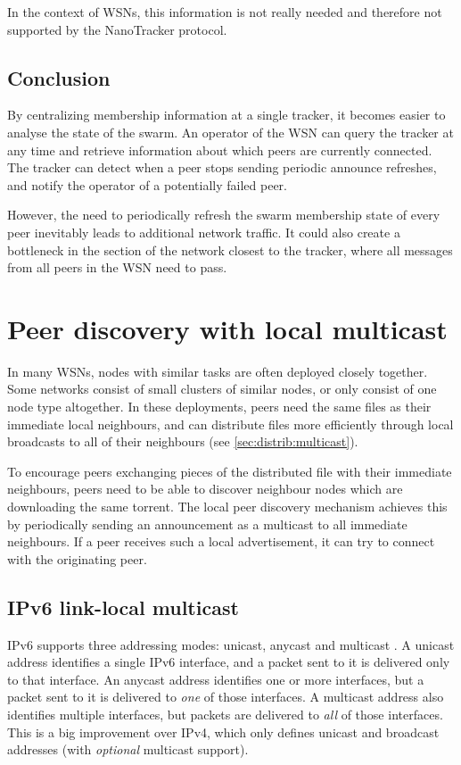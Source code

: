 In the context of \glspl{WSN}, this information is not really needed and therefore not supported by the NanoTracker protocol.

\subsection{Conclusion}
By centralizing membership information at a single tracker, it becomes easier to analyse the state of the swarm. An operator of the \gls{WSN} can query the tracker at any time and retrieve information about which peers are currently connected. The tracker can detect when a peer stops sending periodic announce refreshes, and notify the operator of a potentially failed peer.

However, the need to periodically refresh the swarm membership state of every peer inevitably leads to additional network traffic. It could also create a bottleneck in the section of the network closest to the tracker, where all messages from all peers in the \gls{WSN} need to pass.

\section{Peer discovery with local multicast}
\label{sec:discovery:local}
In many \glspl{WSN}, nodes with similar tasks are often deployed closely together. Some networks consist of small clusters of similar nodes, or only consist of one node type altogether. In these deployments, peers need the same files as their immediate local neighbours, and can distribute files more efficiently through local broadcasts to all of their neighbours (see \ref{sec:distrib:multicast}).

To encourage peers exchanging pieces of the distributed file with their immediate neighbours, peers need to be able to discover neighbour nodes which are downloading the same torrent. The local peer discovery mechanism achieves this by periodically sending an announcement as a multicast to all immediate neighbours. If a peer receives such a local advertisement, it can try to connect with the originating peer.

\subsection{IPv6 link-local multicast}
\gls{IPv6} supports three addressing modes: unicast, anycast and multicast \cite{rfc4291}. A unicast address identifies a single \gls{IPv6} interface, and a packet sent to it is delivered only to that interface. An anycast address identifies one or more interfaces, but a packet sent to it is delivered to \emph{one} of those interfaces. A multicast address also identifies multiple interfaces, but packets are delivered to \emph{all} of those interfaces. This is a big improvement over \gls{IPv4}, which only defines unicast and broadcast addresses (with \emph{optional} multicast support).

